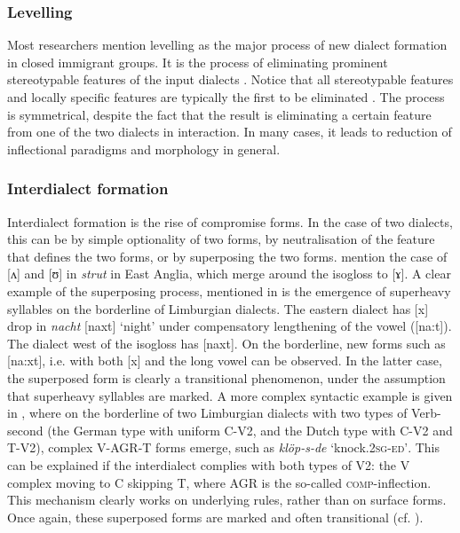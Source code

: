 \documentclass[output=paper,hidelinks,draftmode]{langscibook}
\begin{document}
\subsubsection{Levelling}\label{sec:postma:2.2.1}


Most researchers mention levelling as the major process of new dialect formation in closed immigrant groups. It is the process of eliminating prominent stereotypable features of the input dialects \citep{Dillard1972}. Notice that all stereotypable features and locally specific features are typically the first to be eliminated \citep{Thelander1980, Hinskens1996}. The process is symmetrical, despite the fact that the result is eliminating a certain feature from one of the two dialects in interaction. In many cases, it leads to reduction of inflectional paradigms and morphology in general. 

\subsubsection{Interdialect formation}\label{sec:postma:2.2.2}


Interdialect formation is the rise of compromise forms. In the case of two dialects, this can be by simple optionality of two forms, by neutralisation of the feature that defines the two forms, or by superposing the two forms. \citet{Chambers1998} mention the case of [ʌ] and [ʊ] in \textit{strut} in East Anglia, which merge around the isogloss to [ɤ]. A clear example of the superposing process, mentioned in \citet[366]{Hinskens1996} is the emergence of superheavy syllables on the borderline of Limburgian dialects. The eastern dialect has [x] drop in \textit{nacht} [naxt] `night' under compensatory lengthening of the vowel ([na:t]). The dialect west of the isogloss has [naxt]. On the borderline, new forms such as [na:xt], i.e. with both [x] and the long vowel can be observed. In the latter case, the superposed form is clearly a transitional phenomenon, under the assumption that superheavy syllables are marked. A more complex syntactic example is given in \citet{Postma2014}, where on the borderline of two Limburgian dialects with two types of Verb-second (the German type with uniform C-V2, and the Dutch type with C-V2 and T-V2), complex V-AGR-T forms emerge, such as \textit{klöp-s-de} `knock.\textsc{2sg}{}-\textsc{ed'}. This can be explained if the interdialect complies with both types of V2: the V complex moving to C skipping T, where AGR is the so-called \textsc{comp}-inflection. This mechanism clearly works on underlying rules, rather than on surface forms. Once again, these superposed forms are marked and often transitional (cf. \citealt{Cornips2006}).
\end{document}
